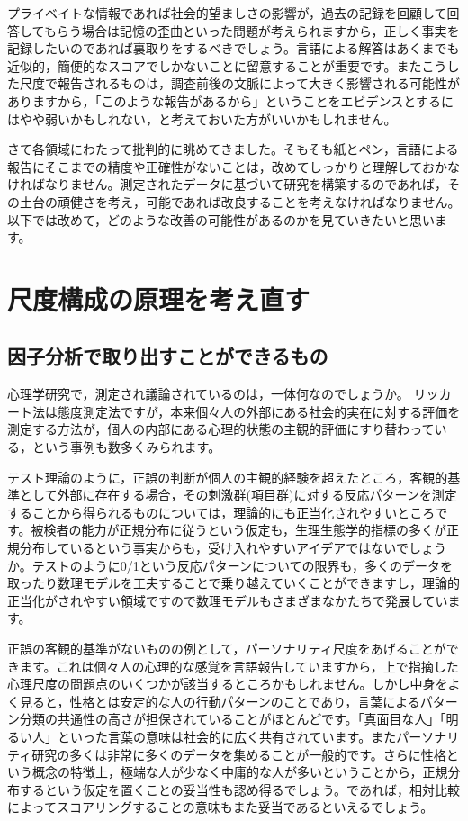\documentclass{ltjsbook}
\begin{document}
プライベイトな情報であれば社会的望ましさの影響が，過去の記録を回顧して回答してもらう場合は記憶の歪曲といった問題が考えられますから，正しく事実を記録したいのであれば裏取りをするべきでしょう。言語による解答はあくまでも近似的，簡便的なスコアでしかないことに留意することが重要です。またこうした尺度で報告されるものは，調査前後の文脈によって大きく影響される可能性がありますから，「このような報告があるから」ということをエビデンスとするにはやや弱いかもしれない，と考えておいた方がいいかもしれません。


さて各領域にわたって批判的に眺めてきました。そもそも紙とペン，言語による報告にそこまでの精度や正確性がないことは，改めてしっかりと理解しておかなければなりません。測定されたデータに基づいて研究を構築するのであれば，その土台の頑健さを考え，可能であれば改良することを考えなければなりません。以下では改めて，どのような改善の可能性があるのかを見ていきたいと思います。

\section{尺度構成の原理を考え直す}
\subsection{因子分析で取り出すことができるもの}
心理学研究で，測定され議論されているのは，一体何なのでしょうか。
リッカート法は態度測定法ですが，本来個々人の外部にある社会的実在に対する評価を測定する方法が，個人の内部にある心理的状態の主観的評価にすり替わっている，という事例も数多くみられます。

テスト理論のように，正誤の判断が個人の主観的経験を超えたところ，客観的基準として外部に存在する場合，その刺激群(項目群)に対する反応パターンを測定することから得られるものについては，理論的にも正当化されやすいところです。被検者の能力が正規分布に従うという仮定も，生理生態学的指標の多くが正規分布しているという事実からも，受け入れやすいアイデアではないでしょうか。テストのように0/1という反応パターンについての限界も，多くのデータを取ったり数理モデルを工夫することで乗り越えていくことができますし，理論的正当化がされやすい領域ですので数理モデルもさまざまなかたちで発展しています。

正誤の客観的基準がないものの例として，パーソナリティ尺度をあげることができます。これは個々人の心理的な感覚を言語報告していますから，上で指摘した心理尺度の問題点のいくつかが該当するところかもしれません。しかし中身をよく見ると，性格とは安定的な人の行動パターンのことであり，言葉によるパターン分類の共通性の高さが担保されていることがほとんどです。「真面目な人」「明るい人」といった言葉の意味は社会的に広く共有されています。またパーソナリティ研究の多くは非常に多くのデータを集めることが一般的です。さらに性格という概念の特徴上，極端な人が少なく中庸的な人が多いということから，正規分布するという仮定を置くことの妥当性も認め得るでしょう。であれば，相対比較によってスコアリングすることの意味もまた妥当であるといえるでしょう。
\end{document}

